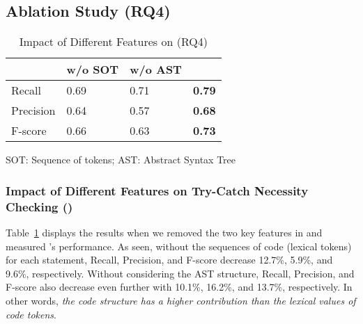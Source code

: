 \subsection{Ablation Study (RQ4)}
\label{sec:rq4}



\begin{table}[t]
  \caption{Impact of Different Features on {\xblock} (RQ4)}
  \vspace{-12pt}
  \begin{center}
    \small
		\renewcommand{\arraystretch}{1}
		\begin{tabular}{p{1.75cm}<{\centering}|p{1.75cm}<{\centering}|p{1.75cm}<{\centering}|p{1.75cm}<{\centering}}
			\hline
			  & \tool w/o SOT & \tool w/o AST & \tool \\
			\hline
			Recall    & 0.69 & 0.71 & \textbf{0.79} \\
			Precision & 0.64 & 0.57 &\textbf{0.68} \\
			F-score   & 0.66 & 0.63 &\textbf{0.73} \\
			\hline
		\end{tabular}
		SOT: Sequence of tokens; AST: Abstract Syntax Tree
		\label{tab:sensi-xblock}
	\end{center}
\end{table}

\subsubsection{Impact of Different Features on Try-Catch Necessity Checking ({\xblock})}

Table~\ref{tab:sensi-xblock} displays the results when we removed the
two key features in {\tool} and measured {\xblock}'s performance. As
seen, without the sequences of code (lexical tokens) for each
statement, Recall, Precision, and F-score decrease 12.7\%, 5.9\%, and
9.6\%, respectively. Without considering the AST structure, Recall,
Precision, and F-score also decrease even further with 10.1\%, 16.2\%, and
13.7\%, respectively. In other words, {\em the code structure has a higher
contribution than the lexical values of code tokens}.



